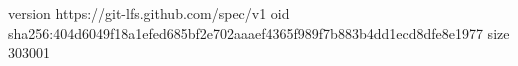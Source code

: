 version https://git-lfs.github.com/spec/v1
oid sha256:404d6049f18a1efed685bf2e702aaaef4365f989f7b883b4dd1ecd8dfe8e1977
size 303001
